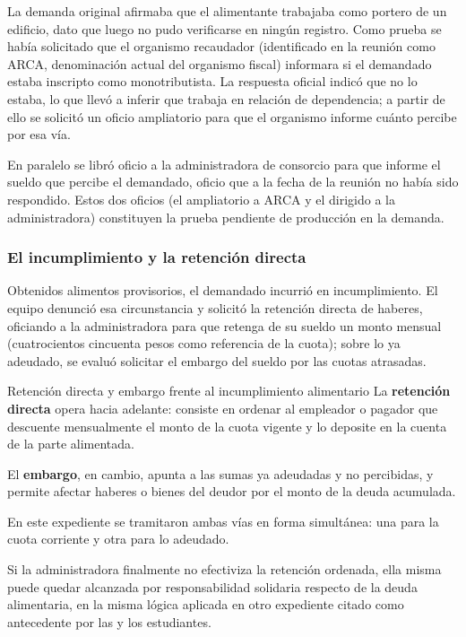 \documentclass[12pt,oneside]{book}
\begin{document}
La demanda original afirmaba que el alimentante trabajaba como portero de un edificio, dato que luego no pudo verificarse en ningún registro. Como prueba se había solicitado que el organismo recaudador (identificado en la reunión como ARCA, denominación actual del organismo fiscal) informara si el demandado estaba inscripto como monotributista. La respuesta oficial indicó que no lo estaba, lo que llevó a inferir que trabaja en relación de dependencia; a partir de ello se solicitó un oficio ampliatorio para que el organismo informe cuánto percibe por esa vía.

En paralelo se libró oficio a la administradora de consorcio para que informe el sueldo que percibe el demandado, oficio que a la fecha de la reunión no había sido respondido. Estos dos oficios (el ampliatorio a ARCA y el dirigido a la administradora) constituyen la prueba pendiente de producción en la demanda.

\subsubsection{El incumplimiento y la retención directa}

Obtenidos alimentos provisorios, el demandado incurrió en incumplimiento. El equipo denunció esa circunstancia y solicitó la retención directa de haberes, oficiando a la administradora para que retenga de su sueldo un monto mensual (cuatrocientos cincuenta pesos como referencia de la cuota); sobre lo ya adeudado, se evaluó solicitar el embargo del sueldo por las cuotas atrasadas.

\begin{definition}{Retención directa y embargo frente al incumplimiento alimentario}
La \textbf{retención directa} opera hacia adelante: consiste en ordenar al empleador o pagador que descuente mensualmente el monto de la cuota vigente y lo deposite en la cuenta de la parte alimentada.

El \textbf{embargo}, en cambio, apunta a las sumas ya adeudadas y no percibidas, y permite afectar haberes o bienes del deudor por el monto de la deuda acumulada.

En este expediente se tramitaron ambas vías en forma simultánea: una para la cuota corriente y otra para lo adeudado.
\end{definition}

Si la administradora finalmente no efectiviza la retención ordenada, ella misma puede quedar alcanzada por responsabilidad solidaria respecto de la deuda alimentaria, en la misma lógica aplicada en otro expediente citado como antecedente por las y los estudiantes.
\end{document}
